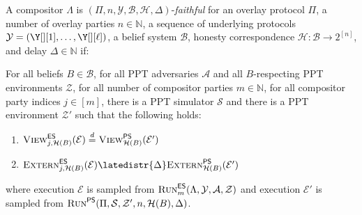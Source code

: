 \begin{definition}
  A compositor $\Lambda$
  is $(\Pi, n, \mathcal{Y}, \mathcal{B}, \mathcal{H}, \Delta)$-\emph{faithful}
  for an overlay protocol $\Pi$,
  a number of overlay parties $n \in \mathbb{N}$,
  a sequence of underlying protocols $\mathcal{Y} = (\Y[][1], \ldots, \Y[][\ell])$,
  a belief system $\mathcal{B}$,
  honesty correspondence $\mathcal{H}: \mathcal{B} \longrightarrow 2^{[n]}$,
  and delay $\Delta \in \mathbb{N}$ if:

  For all beliefs $B \in \mathcal{B}$,
  for all PPT adversaries $\mathcal{A}$ and all
  $B$-respecting PPT environments $\mathcal{Z}$,
  for all number of compositor parties $m \in \mathbb{N}$,
  for all compositor party indices $j \in [m]$,
  there is a PPT simulator $\mathcal{S}$ and there is a
  PPT environment $\mathcal{Z}'$ such that
  the following holds:

  \begin{enumerate}
    \item $\LCView_{j,\mathcal{H}(B)}(\mathcal{E}) \distreq \PEView_{\mathcal{H}(B)}(\mathcal{E}')$
    \item $\LCExtern_{j,\mathcal{H}(B)}(\mathcal{E}) \latedistr{\Delta} \PEExtern_{\mathcal{H}(B)}(\mathcal{E}')$
  \end{enumerate}

  where execution $\mathcal{E}$ is sampled from
  $\textsc{Run}^{\textsf{ES}}_m(\Lambda, \mathcal{Y}, \mathcal{A}, \mathcal{Z})$
  and execution $\mathcal{E}'$ is sampled from
  $\textsc{Run}^{\textsf{PS}}(\Pi, \mathcal{S}, \mathcal{Z}', n, \mathcal{H}(B), \Delta)$.
\end{definition}


